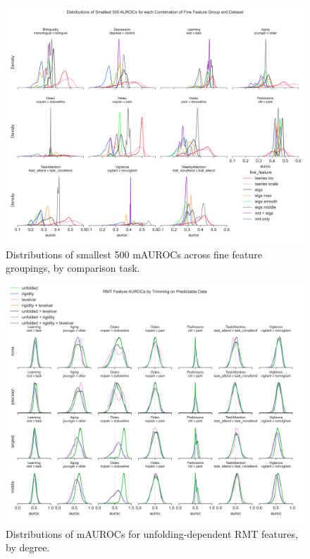 \documentclass{article}  %
\begin{document}
\begin{spacing}{1}
\begin{figure}
\begin{center}
\includegraphics[width=\textwidth,height=0.9\textheight,keepaspectratio]{fine_feature_smallest_by_subgroup.png}
\end{center}
\caption
{ \label{fig:fine-smallest}
Distributions of smallest 500 mAUROCs across fine feature groupings, by comparison task.}
\end{figure}

\begin{figure}
\begin{center}
\includegraphics[width=\textwidth,height=0.9\textheight,keepaspectratio]{rmt_feature_auroc_by_trim.png}
\end{center}
\caption
{ \label{fig:fine-trim}
Distributions of mAUROCs for unfolding-dependent RMT features, by degree.}
\end{figure}



\end{spacing}
\end{document}
